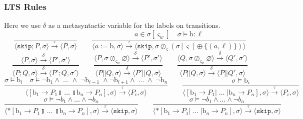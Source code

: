 \documentclass[times,10pt]{article}
\begin{document}
\subsubsection{LTS Rules}
Here we use $\delta$ as a metasyntactic variable for the labels on transitions.
$$
    \frac{}{\langle \mathtt{skip}; P, \sigma \rangle \xrightarrow{\tau} \langle P, \sigma \rangle} \qquad
    \frac{a \in \sigma[\varsigma_w] \quad \sigma \models \mathrm{b} : \ell}{\langle a := \mathrm{b}, \sigma \rangle \xrightarrow{\tau} \langle \mathtt{skip}, \sigma \oslash_\varsigma (\sigma[\varsigma] \oplus \{(a, \ell)\}) \rangle} $$$$
    \frac{\langle P, \sigma \rangle \xrightarrow{\delta} \langle P', \sigma' \rangle}{\langle P ; Q, \sigma \rangle \xrightarrow{\delta} \langle P' ; Q, \sigma' \rangle} \qquad
    \frac{\langle P, \sigma \oslash_{\varsigma_w} \varnothing \rangle \xrightarrow{\delta} \langle P', \sigma' \rangle}{\langle P || Q, \sigma \rangle \xrightarrow{\delta} \langle P' || Q, \sigma \rangle} \qquad
    \frac{\langle Q, \sigma \oslash_{\varsigma_w} \varnothing \rangle \xrightarrow{\delta} \langle Q', \sigma' \rangle}{\langle P || Q, \sigma \rangle \xrightarrow{\delta} \langle P || Q', \sigma \rangle} $$$$
    \frac{\sigma \models \textrm{b}_i \quad \sigma \models \lnot \mathrm{b}_1 \wedge \; \ldots \; \wedge \; \lnot \mathrm{b}_{i-1} \; \wedge \lnot \mathrm{b}_{i+1} \wedge \; \ldots \; \wedge \; \lnot\mathrm{b}_n } {\langle [ \mathrm{b}_1 \rightarrow P_1  \talloblong \; \ldots \; \talloblong \mathrm{b}_n \rightarrow P_n ] , \sigma \rangle \xrightarrow{\tau} \langle P_i , \sigma\rangle  } \qquad
    \frac{\sigma \models \textrm{b}_i} {\langle [ \mathrm{b}_1 \rightarrow P_1  | \; \ldots \; | \mathrm{b}_n \rightarrow P_n ] , \sigma \rangle \xrightarrow{\tau} \langle P_i , \sigma\rangle  } $$$$
    \frac{\sigma \models \lnot b_1 \wedge \ldots \wedge \lnot b_n}{\langle *[ \mathrm{b}_1 \rightarrow P_1  \talloblong \; \ldots \; \talloblong \mathrm{b}_n \rightarrow P_n ] , \sigma \rangle \xrightarrow{\tau} \langle \mathtt{skip} , \sigma\rangle } \qquad
    \frac{\sigma \models \lnot b_1 \wedge \ldots \wedge \lnot b_n}{\langle *[ \mathrm{b}_1 \rightarrow P_1  | \; \ldots \; | \mathrm{b}_n \rightarrow P_n ] , \sigma \rangle \xrightarrow{\tau} \langle \mathtt{skip} , \sigma \rangle } $$$$
$$
\end{document}
